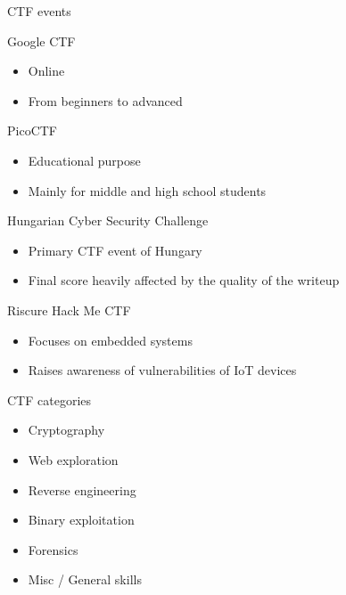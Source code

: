 \documentclass[12 pt]{beamer}
\begin{document}
\begin{frame}{CTF events}

  \begin{block}{Google CTF}
    \begin{itemize}
      \item{Online}
      \item{From beginners to advanced}
    \end{itemize}
  \end{block}

  \begin{block}{PicoCTF}
    \begin{itemize}
      \item{Educational purpose}
      \item{Mainly for middle and high school students}
    \end{itemize}
  \end{block}

  \begin{block}{Hungarian Cyber Security Challenge}
    \begin{itemize}
      \item{Primary CTF event of Hungary}
      \item{Final score heavily affected by the quality of the writeup}
    \end{itemize}
  \end{block}

  \begin{block}{Riscure Hack Me CTF}
    \begin{itemize}
      \item{Focuses on embedded systems}
      \item{Raises awareness of vulnerabilities of IoT devices}
    \end{itemize}
  \end{block}

\end{frame}


\begin{frame}{CTF categories}

    \begin{itemize}
      \item{Cryptography}

      \bigskip

      \item{Web exploration}

      \bigskip

      \item{Reverse engineering}

      \bigskip

      \item{Binary exploitation}

      \bigskip

      \item{Forensics}

      \bigskip

      \item{Misc / General skills}
    \end{itemize}

\end{frame}
\end{document}
